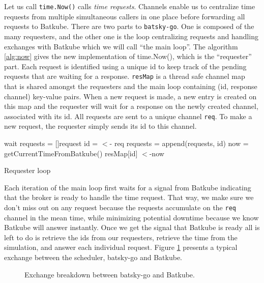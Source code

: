 Let us call \texttt{time.Now()} calls \textit{time requests}. Channels enable
us to centralize time requests from multiple simultaneous callers in one place
before forwarding all requests to Batkube. There are two parts to
\texttt{batsky-go}. One is composed of the many requesters, and the other one
is the loop centralizing requests and handling exchanges with Batkube which we
will call ``the main loop''.  The algorithm \ref{alg:now} gives the new
implementation of time.Now(), which is the ``requester'' part. Each request is
identified using a unique id to keep track of the pending requests that are
waiting for a response. \texttt{resMap} is a thread safe channel map that is
shared amongst the requesters and the main loop containing (id, response
channel) key-value pairs. When a new request is made, a new entry is created on
this map and the requester will wait for a response on the newly created
channel, associated with its id. All requests are sent to a unique channel
\texttt{req}. To make a new request, the requester simply sends its id to this
channel.

\begin{algorithm}[]
\DontPrintSemicolon
{}
 {
	wait\;
}
requests = []request\;
 {
	id = $<$- req 
	requests = append(requests, id)\;
}
now = getCurrentTimeFromBatkube()\;
 {
	resMap[id] $<$-now 
}

\caption{Requester loop}
\label{alg:reqLoop}
\end{algorithm}

Each iteration of the main loop first waits for a signal from Batkube
indicating that the broker is ready to handle the time request. That way, we
make sure we don't miss out on any request because the requests accumulate on
the \texttt{req} channel in the mean time, while minimizing potential downtime
because we know Batkube will answer instantly. Once we get the signal that
Batkube is ready all is left to do is retrieve the ids from our requesters,
retrieve the time from the simulation, and answer each individual request.
Figure \ref{fig:time-interception} presents a typical exchange between the
scheduler, batsky-go and Batkube.

\begin{figure}[]
	\centering
	
	\caption{Exchange breakdown between batsky-go and Batkube.}
	\label{fig:time-interception}
\end{figure}

